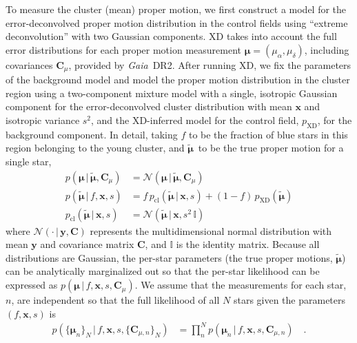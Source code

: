\documentclass[twocolumn]{aastex62}
\newcommand{\acronym}[1]{{\small{#1}}}
\newcommand{\gaia}{\textsl{Gaia}}
\newcommand{\DR}[1]{\acronym{DR#1}}
\newcommand{\bs}[1]{\boldsymbol{#1}}
\newcommand{\given}{\,|\,}
\newcommand{\norm}{\mathcal{N}}
\newcommand{\mat}[1]{\mathbf{#1}}
\newcommand{\truepm}{\ensuremath{\tilde{\bs{\mu}}}}
\begin{document}
To measure the cluster (mean) proper motion, we first construct a model for the error-deconvolved proper motion distribution in the control fields using ``extreme deconvolution'' \citep[XD;][]{Bovy:2011} with two Gaussian components. XD takes into account the full error distributions for each proper motion measurement $\bs{\mu} = (\mu_\alpha, \mu_\delta)$, including covariances $\mat{C}_\mu$, provided by \gaia\ \DR{2}.
After running XD, we fix the parameters of the background model and model the proper motion distribution in the cluster region using a two-component mixture model with a single, isotropic Gaussian component for the error-deconvolved cluster distribution with mean $\bs{x}$ and isotropic variance $s^2$, and the XD-inferred model for the control field, $p_{\textrm{XD}}$, for the background component.
In detail, taking $f$ to be the fraction of blue stars in this region belonging to the young cluster, and \truepm\ to be the true proper motion for a single star,
\begin{align}
    p(\bs{\mu} \given \truepm, \mat{C}_\mu) &=
        \norm(\bs{\mu} \given \truepm, \mat{C}_\mu)\\
    p(\truepm \given f, \bs{x}, s) &=
        f \, p_{\textrm{cl}}(\truepm \given \bs{x}, s)
        + (1-f) \, p_{\textrm{XD}}(\truepm)\\
    p_{\textrm{cl}}(\truepm \given \bs{x}, s) &=
        \norm(\truepm \given \bs{x}, s^2 \, \mathbb{I})
\end{align}
where $\norm(\cdot \given \bs{y}, \mat{C})$ represents the multidimensional normal distribution with mean $\bs{y}$ and covariance matrix $\mat{C}$, and $\mathbb{I}$ is the identity matrix.
Because all distributions are Gaussian, the per-star parameters (the true proper motions, \truepm) can be analytically marginalized out so that the per-star likelihood can be expressed as $p(\bs{\mu} \given f, \bs{x}, s, \mat{C}_\mu)$.
We assume that the measurements for each star, $n$, are independent so that the full likelihood of all $N$ stars given the parameters $(f, \bs{x}, s)$ is
\begin{align}
    p(\{\bs{\mu}_n\}_N \given f, \bs{x}, s, \{\mat{C}_{\mu, n}\}_N) &=
        \prod_n^N p(\bs{\mu}_n \given f, \bs{x}, s, \mat{C}_{\mu, n}) \quad .
        \label{eq:likelihood}
\end{align}
\end{document}

